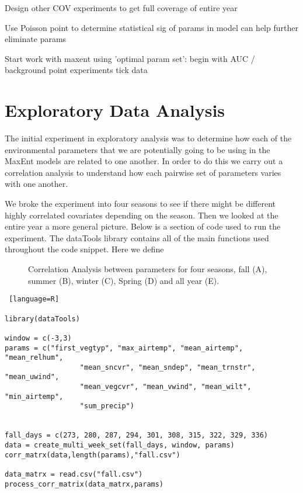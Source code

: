 Design other COV experiments to get full coverage of entire year \newline

Use Poisson point to determine statistical sig of params in model can help further eliminate params\newline

Start work with maxent using 'optimal param set': \newline
begin with AUC / background point experiments \newline
tick data \newline
\pagebreak


\section{Exploratory Data Analysis }

The initial experiment in exploratory analysis was to determine how each of the environmental parameters that we are potentially going to be using in the MaxEnt models are related to one another. In order to do this we carry out a correlation analysis to understand how each pairwise set of parameters varies with one another. \newline

\noindent We broke the experiment into four seasons to see if there might be different highly correlated covariates depending on the season. Then we looked at the entire year a more general picture. Below is a section of code used to run the experiment. The dataTools library contains all of the main functions used throughout the code snippet. Here we define 

\begin{figure} [t]
\centerline{}
\caption{Correlation Analysis between parameters for four seasons, fall (A), summer (B), winter (C), Spring (D) and all year (E).}
\label{fig6}
\end{figure}


\begin{lstlisting} [language=R]

library(dataTools)

window = c(-3,3)
params = c("first_vegtyp", "max_airtemp", "mean_airtemp", "mean_relhum", 
                  "mean_sncvr", "mean_sndep", "mean_trnstr", "mean_uwind", 
                  "mean_vegcvr", "mean_vwind", "mean_wilt", "min_airtemp", 
                  "sum_precip")
           
           
fall_days = c(273, 280, 287, 294, 301, 308, 315, 322, 329, 336)
data = create_multi_week_set(fall_days, window, params)
corr_matrx(data,length(params),"fall.csv")

data_matrx = read.csv("fall.csv")
process_corr_matrix(data_matrx,params)

\end{lstlisting}

